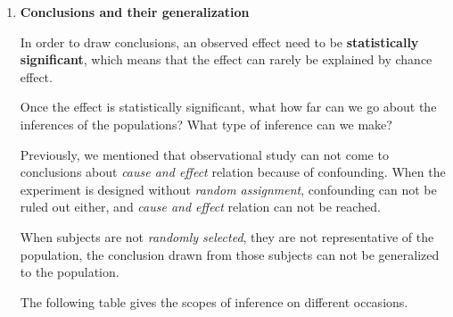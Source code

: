 \documentclass[a4paper, 12pt,twoside]{book}
\begin{document}
\begin{enumerate}[(1)]
 \item \textbf{Conclusions and their generalization}
 \vspace{0.3cm}
 
 In order to draw conclusions, an observed effect need to be \textbf{statistically significant}, which means that the effect can rarely be explained by chance effect. 
 \vspace{0.3cm}
 
 Once the effect is statistically significant, what how far can we go about the inferences of the populations? What type of inference can we make?
 \vspace{0.3cm}
 
 Previously, we mentioned that observational study can not come to conclusions about \textit{cause and effect} relation because of confounding. When the experiment is designed without \textit{random assignment}, confounding can not be ruled out either, and \textit{cause and effect} relation can not be reached.
 \vspace{0.3cm}
 
 When subjects are not \textit{randomly selected}, they are not representative of the population, the conclusion drawn from those subjects can not be generalized to the population. 
 \vspace{0.3cm}
 
 The following table gives the scopes of inference on different occasions.
    
 

\end{enumerate}
\end{document}
